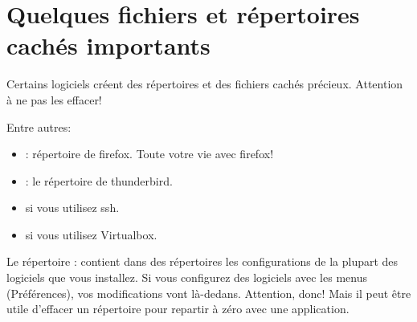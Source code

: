 \section{Quelques fichiers et répertoires cachés importants}
Certains logiciels créent des répertoires et des fichiers cachés
précieux.
Attention à ne pas les effacer!

Entre autres:
\begin{itemize}
  \item {}: répertoire de firefox. Toute votre vie avec firefox!
  \item {}: le répertoire de thunderbird.
  \item {} si vous utilisez ssh.
  \item {} si vous utilisez Virtualbox.
\end{itemize}
Le répertoire : contient dans des répertoires les
configurations de la plupart des logiciels que vous installez.
Si vous configurez des logiciels avec les menus (Préférences), vos
modifications vont là-dedans. Attention, donc! Mais il peut être utile
d'effacer un répertoire pour \og repartir à zéro\fg{} avec une application.
